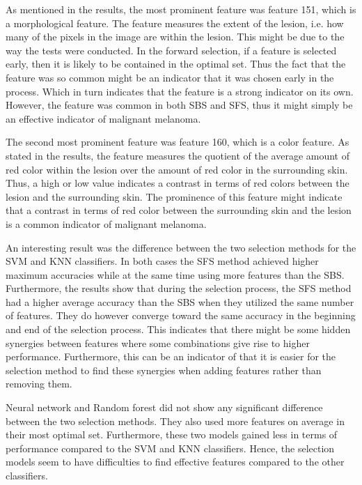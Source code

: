 \documentclass{kththesis}
\begin{document}
As mentioned in the results, the most prominent feature was feature 151, which is a morphological feature. The feature measures the extent of the lesion, i.e. how many of the pixels in the image are within the lesion. This might be due to the way the tests were conducted. In the forward selection, if a feature is selected early, then it is likely to be contained in the optimal set. Thus the fact that the feature was so common might be an indicator that it was chosen early in the process. Which in turn indicates that the feature is a strong indicator on its own. However, the feature was common in both SBS and SFS, thus it might simply be an effective indicator of malignant melanoma.

The second most prominent feature was feature 160, which is a color feature. As stated in the results, the feature measures the quotient of the average amount of red color within the lesion over the amount of red color in the surrounding skin. Thus, a high or low value indicates a contrast in terms of red colors between the lesion and the surrounding skin. The prominence of this feature might indicate that a contrast in terms of red color between the surrounding skin and the lesion is a common indicator of malignant melanoma. %

An interesting result was the difference between the two selection methods for the SVM and KNN classifiers. In both cases the SFS method achieved higher maximum accuracies while at the same time using more features than the SBS. Furthermore, the results  show that during the selection process, the SFS method had a higher average accuracy than the SBS when they utilized the same number of features. They do however converge toward the same accuracy in the beginning and end of the selection process. This indicates that there might be some hidden synergies between features where some combinations give rise to higher performance. Furthermore, this can be an indicator of that it is easier for the selection method to find these synergies when adding features rather than removing them.

Neural network and Random forest did not show any significant difference between the two selection methods. They also used more features on average in their most optimal set. Furthermore, these two models gained less in terms of performance compared to the SVM and KNN classifiers. Hence, the selection models seem to have difficulties to find effective features compared to the other classifiers.
\end{document}
